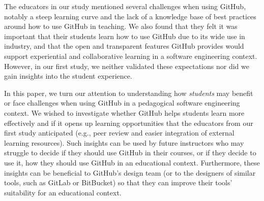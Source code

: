 The educators in our study mentioned several challenges when using GitHub, notably a steep learning curve and the lack of a knowledge base of best practices around how to use GitHub in teaching. We also found that they felt it was important that their students learn how to use GitHub due to its wide use in industry, and that the open and transparent features GitHub provides would support experiential and collaborative learning in a software engineering context. However, in our first study, we neither validated these expectations nor did we gain insights into the student experience.

In this paper, we turn our attention to understanding how \emph{students} may benefit or face challenges when using GitHub in a pedagogical software engineering context. We wished to investigate whether GitHub helps students learn more effectively and if it opens up learning opportunities that the educators from our first study anticipated (e.g., peer review and easier integration of external learning resources). Such insights can be used by future instructors who may struggle to decide if they should use GitHub in their courses, or if they decide to use it, how they should use GitHub in an educational context. Furthermore, these insights can be beneficial to GitHub's design team (or to the designers of similar tools, such as GitLab or BitBucket) so that they can improve their tools' suitability for an educational context.




